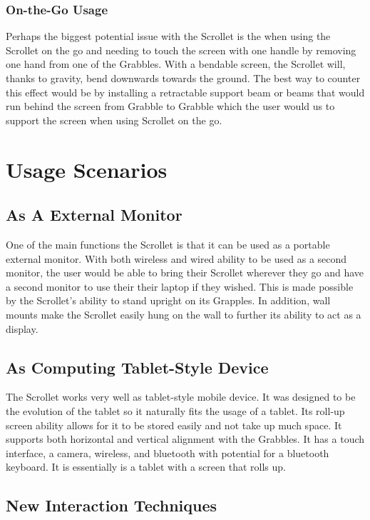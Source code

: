 \documentclass[a4paper]{article}
\begin{document}
\subsubsection{On-the-Go Usage}
Perhaps the biggest potential issue with the Scrollet is the when using the Scrollet on the go and needing to touch the screen with one handle by removing one hand from one of the Grabbles. With a bendable screen, the Scrollet will, thanks to gravity, bend downwards towards the ground. The best way to counter this effect would be by installing a retractable support beam or beams that would run behind the screen from Grabble to Grabble which the user would us to support the screen when using Scrollet on the go.

\section{Usage Scenarios}
\subsection{As A External Monitor}
One of the main functions the Scrollet is that it can be used as a portable external monitor. With both wireless and wired ability to be used as a second monitor, the user would be able to bring their Scrollet wherever they go and have a second monitor to use their their laptop if they wished. This is made possible by the Scrollet's ability to stand upright on its Grapples. In addition, wall mounts make the Scrollet easily hung on the wall to further its ability to act as a display.

\subsection{As Computing Tablet-Style Device}
The Scrollet works very well as tablet-style mobile device. It was designed to be the evolution of the tablet so it naturally fits the usage of a tablet. Its roll-up screen ability allows for it to be stored easily and not take up much space. It supports both horizontal and vertical alignment with the Grabbles. It has a touch interface, a camera, wireless, and bluetooth with potential for a bluetooth keyboard. It is essentially is a tablet with a screen that rolls up.

\subsection{New Interaction Techniques}
\end{document}
